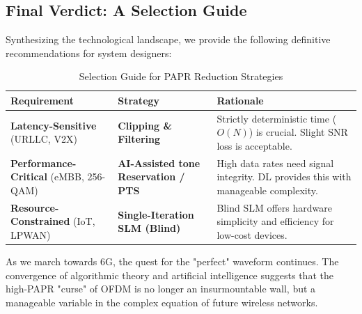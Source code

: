 \documentclass[conference]{IEEEtran}
\begin{document}
\subsection{Final Verdict: A Selection Guide}
Synthesizing the technological landscape, we provide the following definitive recommendations for system designers:

\begin{table}[htbp]
    \caption{Selection Guide for PAPR Reduction Strategies}
    \begin{center}
        \begin{tabular}{|p{2.5cm}|p{2cm}|p{3cm}|}
            \hline
            \textbf{Requirement}                          & \textbf{Strategy}                           & \textbf{Rationale}                                                                  \\ \hline
            \textbf{Latency-Sensitive} (URLLC, V2X)       & \textbf{Clipping \& Filtering}              & Strictly deterministic time ($O(N)$) is crucial. Slight SNR loss is acceptable.     \\ \hline
            \textbf{Performance-Critical} (eMBB, 256-QAM) & \textbf{AI-Assisted tone Reservation / PTS} & High data rates need signal integrity. DL provides this with manageable complexity. \\ \hline
            \textbf{Resource-Constrained} (IoT, LPWAN)    & \textbf{Single-Iteration SLM (Blind)}       & Blind SLM offers hardware simplicity and efficiency for low-cost devices.           \\ \hline
        \end{tabular}
        \label{tab3}
    \end{center}
\end{table}

As we march towards 6G, the quest for the "perfect" waveform continues. The convergence of algorithmic theory and artificial intelligence suggests that the high-PAPR "curse" of OFDM is no longer an insurmountable wall, but a manageable variable in the complex equation of future wireless networks.
\end{document}
